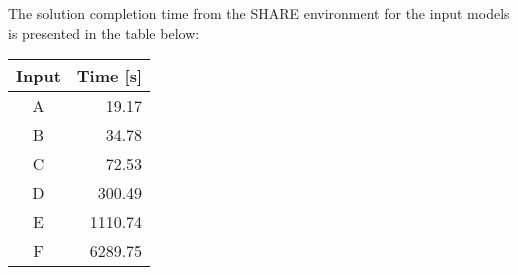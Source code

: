 The solution completion time from the SHARE environment for the input models is presented in the table below:
\begin{center}
\begin{tabular}{cr}
\hline
\textbf{Input} & \textbf{Time {[}s{]}} \\
\hline
A              & 19.17                 \\
B              & 34.78                 \\
C              & 72.53                 \\
D              & 300.49                \\
E              & 1110.74               \\
F              & 6289.75              \\ 
\hline
\end{tabular}
\end{center}





